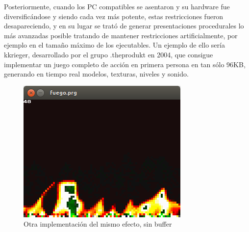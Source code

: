 \documentclass[a4,12pt]{article}
\begin{document}
Posteriormente, cuando los PC compatibles se asentaron y su hardware fue diversificándose y siendo cada vez más potente, estas restricciones fueron desapareciendo, y en su lugar se trató de generar presentaciones procedurales lo más avanzadas posible tratando de mantener restricciones artificialmente, por ejemplo en el tamaño máximo de los ejecutables.
\newline
\newline
Un ejemplo de ello sería kkrieger, desarrollado por el grupo .theprodukt en 2004, que consigue implementar un juego completo de acción en primera persona en tan sólo 96KB, generando en tiempo real modelos, texturas, niveles y sonido.


\begin{figure}[h!]
  \centering
    \includegraphics{img/fuego}
  \caption{Otra implementación del mismo efecto, sin buffer}
\end{figure}
\end{document}
